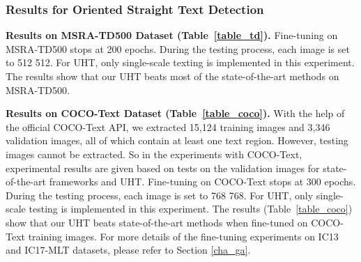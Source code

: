 \documentclass[10pt,twocolumn,letterpaper]{article}
\begin{document}
\subsubsection{Results for Oriented Straight Text Detection}

\textbf{Results on MSRA-TD500 Dataset (Table~\ref{table_td}).} Fine-tuning on MSRA-TD500 stops at 200 epochs. During the testing process, each image is set to 512  512. For UHT, only single-scale texting is implemented in this experiment. The results show that our UHT beats most of the state-of-the-art methods on MSRA-TD500.

\textbf{Results on COCO-Text Dataset (Table~\ref{table_coco}).} 
With the help of the official COCO-Text API, we extracted 15,124 training images and 3,346 validation images, all of which contain at least one text region. However, testing images cannot be extracted. So in the experiments with COCO-Text, experimental results are given based on tests on the validation images for state-of-the-art frameworks and UHT. Fine-tuning on COCO-Text stops at 300 epochs. During the testing process, each image is set to 768  768. For UHT, only single-scale testing is implemented in this experiment. The results (Table~\ref{table_coco}) show that our UHT beats state-of-the-art methods when fine-tuned on COCO-Text training images. For more details of the fine-tuning experiments on IC13 and IC17-MLT datasets, please refer to Section \ref{cha_ga}.
\end{document}
